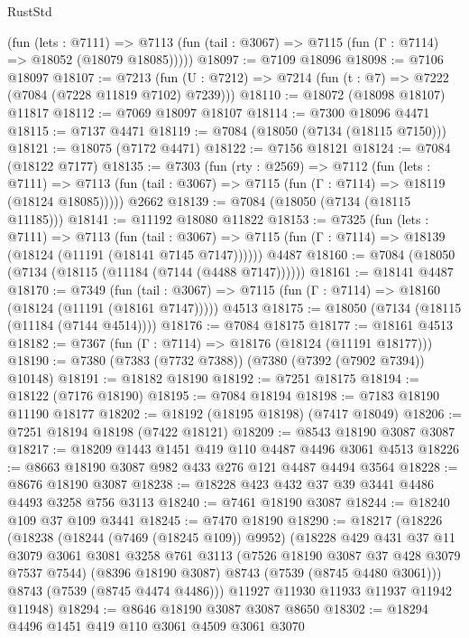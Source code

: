 \begin{lexlean}{RustStd}
\begin{coremodule}
      (fun (lets : @7111) =>
      @7113 (fun (tail : @3067) => @7115 (fun (Γ : @7114) => @18052 (@18079 @18085)))))
@18097 := @7109 @18096
@18098 := @7106 @18097
@18107 := @7213
    (fun (U : @7212) => @7214 (fun (t : @7) => @7222 (@7084 (@7228 @11819 @7102) @7239)))
@18110 := @18072 (@18098 @18107) @11817
@18112 := @7069 @18097 @18107
@18114 := @7300 @18096 @4471
@18115 := @7137 @4471
@18119 := @7084 (@18050 (@7134 (@18115 @7150)))
@18121 := @18075 (@7172 @4471)
@18122 := @7156 @18121
@18124 := @7084 (@18122 @7177)
@18135 := @7303
    (fun (rty : @2569) =>
    @7112
      (fun (lets : @7111) =>
      @7113 (fun (tail : @3067) => @7115 (fun (Γ : @7114) => @18119 (@18124 @18085)))))
    @2662
@18139 := @7084 (@18050 (@7134 (@18115 @11185)))
@18141 := @11192 @18080 @11822
@18153 := @7325
    (fun (lets : @7111) =>
    @7113
      (fun (tail : @3067) =>
      @7115 (fun (Γ : @7114) => @18139 (@18124 (@11191 (@18141 @7145 @7147))))))
    @4487
@18160 := @7084 (@18050 (@7134 (@18115 (@11184 (@7144 (@4488 @7147))))))
@18161 := @18141 @4487
@18170 := @7349
    (fun (tail : @3067) => @7115 (fun (Γ : @7114) => @18160 (@18124 (@11191 (@18161 @7147)))))
    @4513
@18175 := @18050 (@7134 (@18115 (@11184 (@7144 @4514))))
@18176 := @7084 @18175
@18177 := @18161 @4513
@18182 := @7367 (fun (Γ : @7114) => @18176 (@18124 (@11191 @18177)))
@18190 := @7380 (@7383 (@7732 @7388)) (@7380 (@7392 (@7902 @7394)) @10148)
@18191 := @18182 @18190
@18192 := @7251 @18175
@18194 := @18122 (@7176 @18190)
@18195 := @7084 @18194
@18198 := @7183 @18190 @11190 @18177
@18202 := @18192 (@18195 @18198) (@7417 @18049)
@18206 := @7251 @18194 @18198 (@7422 @18121)
@18209 := @8543 @18190 @3087 @3087
@18217 := @18209 @1443 @1451 @419 @110 @4487 @4496 @3061 @4513
@18226 := @8663 @18190 @3087 @982 @433 @276 @121 @4487 @4494 @3564
@18228 := @8676 @18190 @3087
@18238 := @18228 @423 @432 @37 @39 @3441 @4486 @4493 @3258 @756 @3113
@18240 := @7461 @18190 @3087
@18244 := @18240 @109 @37 @109 @3441
@18245 := @7470 @18190
@18290 := @18217
    (@18226
      (@18238
        (@18244 (@7469 (@18245 @109)) @9952)
        (@18228
          @429
          @431
          @37
          @11
          @3079
          @3061
          @3081
          @3258
          @761
          @3113
          (@7526 @18190 @3087 @37 @428 @3079 @7537 @7544)
          (@8396 @18190 @3087)
          @8743
          (@7539 (@8745 @4480 @3061)))
        @8743
        (@7539 (@8745 @4474 @4486)))
      @11927
      @11930
      @11933
      @11937
      @11942
      @11948)
@18294 := @8646 @18190 @3087 @3087 @8650
@18302 := @18294 @4496 @1451 @419 @110 @3061 @4509 @3061 @3070

\end{coremodule}
\end{lexlean}
